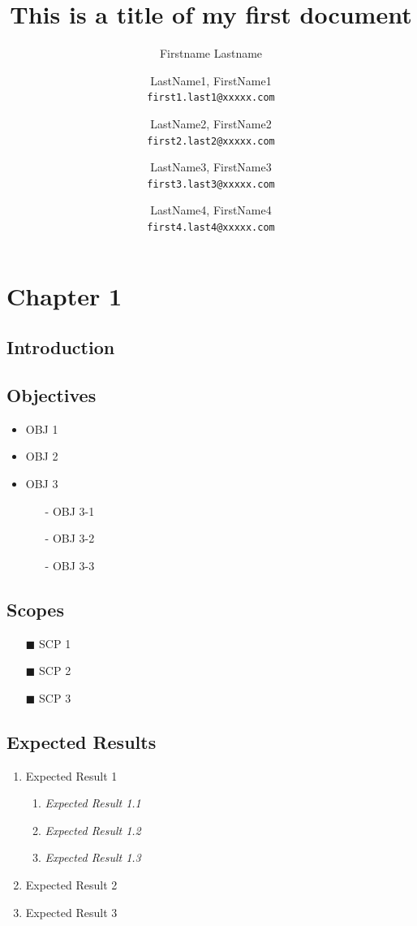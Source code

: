 \documentclass[a4paper]{report} %
\title{This is a title of my first document}
\author{Firstname Lastname}
\author{
		LastName1, FirstName1\\
		\texttt{first1.last1@xxxxx.com} 
		\and
		LastName2, FirstName2\\
		\texttt{first2.last2@xxxxx.com}
		\and
		LastName3, FirstName3\\
		\texttt{first3.last3@xxxxx.com}
		\and
		LastName4, FirstName4\\
		\texttt{first4.last4@xxxxx.com}
	}
\begin{document}
	\maketitle
	\setcounter{chapter}{1}
	\chapter*{Chapter 1}
	
	\section{Introduction}
	
	\section{Objectives}
	\begin{itemize}
		\item OBJ 1
		\item OBJ 2
		\item OBJ 3
		\begin{itemize}
			\item [-] OBJ 3-1
			\item [-] OBJ 3-2
			\item [-] OBJ 3-3
		\end{itemize}
	
	\end{itemize}

	\section{Scopes}
	\begin{itemize}
		\item [$\blacksquare$] SCP 1
		\item [$\blacksquare$] SCP 2
		\item [$\blacksquare$] SCP 3
	\end{itemize}
	
	\section{Expected Results}
	\begin{enumerate} [label=\arabic*)]
		\item Expected Result 1
		\begin{enumerate} [label=\textit{\roman*)}]
			\item \textit{Expected Result 1.1}
			\item \textit{Expected Result 1.2}
			\item \textit{Expected Result 1.3}
		\end{enumerate}
		\item Expected Result 2
		\item Expected Result 3
	\end{enumerate}
\end{document}
